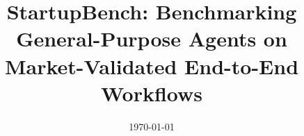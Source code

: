 \documentclass[]{bytedance_seed}
\title{StartupBench: Benchmarking General-Purpose Agents on Market-Validated End-to-End Workflows}
\affiliation[1]{ByteDance Seed}
\affiliation[2]{Nanjing University}
\affiliation[3]{M-A-P}
\affiliation[4]{TokenWave.AI}
\date{\today}
\begin{document}
\maketitle








\clearpage




\clearpage

\beginappendix


\end{document}
